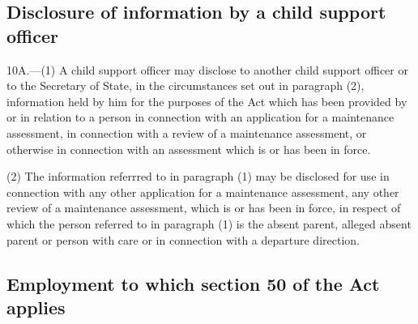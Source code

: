\documentclass[a4paper,12pt]{article}
\begin{document}
\subsection[10A. Disclosure of information by a child support officer]{Disclosure of information by a child support officer}

10A.—(1) A child support officer may disclose to another child support officer or to the Secretary of State, in the circumstances set out in paragraph (2), information held by him for the purposes of the Act which has been provided by or in relation to a person in connection with an application for a maintenance assessment, in connection with a review of a maintenance assessment, or otherwise in connection with an assessment which is or has been in force.

(2) The information referrred to in paragraph (1) may be disclosed for use in connection with any other application for a maintenance assessment, 
any other review of a maintenance assessment, which is or has been in force, in respect of which the person referred to in paragraph (1) is the absent parent, alleged absent parent or person with care
or in connection with a departure direction.  %


\subsection[11. Employment to which section 50 of the Act applies]{Employment to which section 50 of the Act applies}
\end{document}
